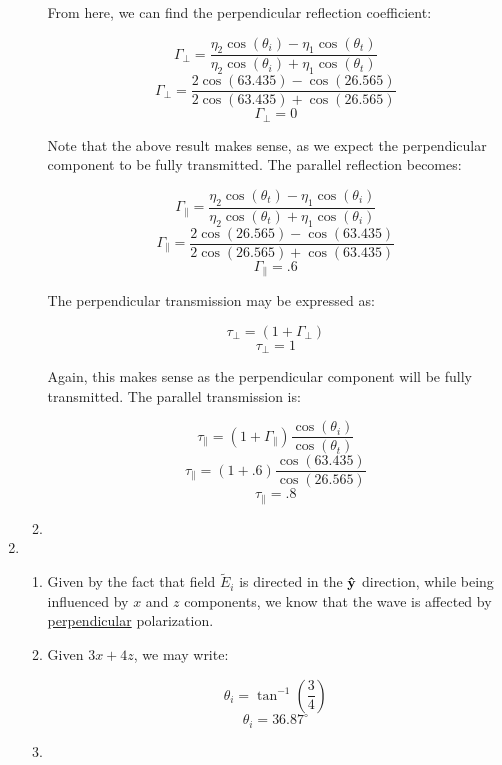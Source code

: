 \begin{enumerate}
\begin{enumerate}
        From here, we can find the perpendicular reflection coefficient:

        $$\Gamma_{\perp}=\frac{\eta_2\cos(\theta_i)-\eta_1\cos(\theta_t)}{\eta_2\cos(\theta_i)+\eta_1\cos(\theta_t)}$$
        $$\Gamma_{\perp}=\frac{2\cos(63.435)-\cos(26.565)}{2\cos(63.435)+\cos(26.565)}$$
        $$\boxed{\Gamma_{\perp}=0}$$

        Note that the above result makes sense, as we expect the perpendicular component to be fully transmitted. The parallel reflection becomes:

        $$\Gamma_{\parallel}=\frac{\eta_2\cos(\theta_t)-\eta_1\cos(\theta_i)}{\eta_2\cos(\theta_t)+\eta_1\cos(\theta_i)}$$
        $$\Gamma_{\parallel}=\frac{2\cos(26.565)-\cos(63.435)}{2\cos(26.565)+\cos(63.435)}$$
        $$\boxed{\Gamma_{\parallel}=.6}$$

        The perpendicular transmission may be expressed as:

        $$\tau_{\perp}=(1+\Gamma_{\perp})$$
        $$\boxed{\tau_{\perp}=1}$$

        Again, this makes sense as the perpendicular component will be fully transmitted. The parallel transmission is:

        $$\tau_{\parallel}=(1+\Gamma_{\parallel})\frac{\cos(\theta_i)}{\cos(\theta_t)}$$
        $$\tau_{\parallel}=(1+.6)\frac{\cos(63.435)}{\cos(26.565)}$$
        $$\boxed{\tau_{\parallel}=.8}$$

      \item 

    \end{enumerate}

  \item

    \begin{enumerate}

      \item 

        Given by the fact that field $\tilde{E}_i$ is directed in the $\bold{\hat{y}}$ direction, while being influenced by $x$ and $z$ components, we know that the wave is affected by \underline{perpendicular} polarization.

      \item 

        Given $3x+4z$, we may write:

        $$\theta_i=\tan^{-1}\left( \frac{3}{4} \right)$$
        $$\boxed{\theta_i=36.87^{\circ}}$$

      \item 


\end{enumerate}
\end{enumerate}
